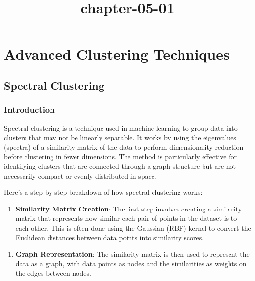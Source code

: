 \documentclass[11pt]{article}
\title{chapter-05-01}
\providecommand{\tightlist}{%
      \setlength{\itemsep}{0pt}\setlength{\parskip}{0pt}}
\begin{document}
    
    \maketitle
    
    

    
    \section{Advanced Clustering
Techniques}\label{advanced-clustering-techniques}

    \subsection{Spectral Clustering}\label{spectral-clustering}

    \subsubsection{Introduction}\label{introduction}

Spectral clustering is a technique used in machine learning to group
data into clusters that may not be linearly separable. It works by using
the eigenvalues (spectra) of a similarity matrix of the data to perform
dimensionality reduction before clustering in fewer dimensions. The
method is particularly effective for identifying clusters that are
connected through a graph structure but are not necessarily compact or
evenly distributed in space.

Here's a step-by-step breakdown of how spectral clustering works:

    \begin{enumerate}
\def\labelenumi{\arabic{enumi}.}
\tightlist
\item
  \textbf{Similarity Matrix Creation}: The first step involves creating
  a similarity matrix that represents how similar each pair of points in
  the dataset is to each other. This is often done using the Gaussian
  (RBF) kernel to convert the Euclidean distances between data points
  into similarity scores.
\end{enumerate}

    \begin{enumerate}
\def\labelenumi{\arabic{enumi}.}
\setcounter{enumi}{1}
\tightlist
\item
  \textbf{Graph Representation}: The similarity matrix is then used to
  represent the data as a graph, with data points as nodes and the
  similarities as weights on the edges between nodes.
\end{enumerate}
\end{document}
